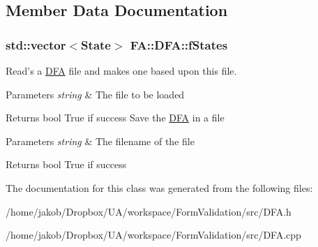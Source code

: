 \subsection{Member Data Documentation}
\hypertarget{classFA_1_1DFA_af61fceea2141e9aed29a38dd0b3f88a7}{
\subsubsection[{f\-States}]{\setlength{\rightskip}{0pt plus 5cm}std\-::vector$<${\bf State}$>$ F\-A\-::\-D\-F\-A\-::f\-States}}\label{classFA_1_1DFA_af61fceea2141e9aed29a38dd0b3f88a7}


Read's a \hyperlink{classFA_1_1DFA}{D\-F\-A} file and makes one based upon this file. 


\begin{DoxyParams}{Parameters}
{\em string} & The file to be loaded\\
\hline
\end{DoxyParams}
\begin{DoxyReturn}{Returns}
bool True if success Save the \hyperlink{classFA_1_1DFA}{D\-F\-A} in a file
\end{DoxyReturn}

\begin{DoxyParams}{Parameters}
{\em string} & The filename of the file\\
\hline
\end{DoxyParams}
\begin{DoxyReturn}{Returns}
bool True if success 
\end{DoxyReturn}


The documentation for this class was generated from the following files\-:\begin{DoxyCompactItemize}
\item 
/home/jakob/\-Dropbox/\-U\-A/workspace/\-Form\-Validation/src/D\-F\-A.\-h\item 
/home/jakob/\-Dropbox/\-U\-A/workspace/\-Form\-Validation/src/D\-F\-A.\-cpp\end{DoxyCompactItemize}
